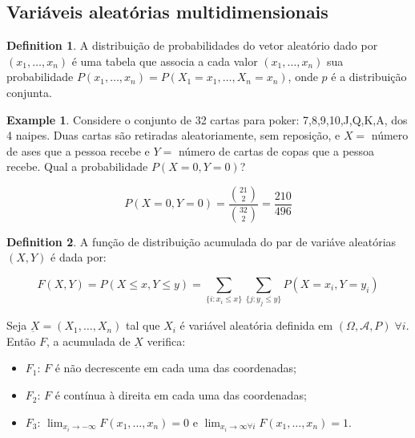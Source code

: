 \documentclass[
]{article}
\providecommand{\tightlist}{%
  \setlength{\itemsep}{0pt}\setlength{\parskip}{0pt}}
\theoremstyle{definition}
\newtheorem{definition}{Definition}[section]
\theoremstyle{definition}
\newtheorem{example}{Example}[section]
\theoremstyle{definition}
\theoremstyle{definition}
\theoremstyle{remark}
\begin{document}
\hypertarget{variuxe1veis-aleatuxf3rias-multidimensionais}{%
\subsection{Variáveis aleatórias multidimensionais}\label{variuxe1veis-aleatuxf3rias-multidimensionais}}

\begin{definition}
A distribuição de probabilidades do vetor aleatório dado por \((x_{1},\ldots,x_{n})\) é uma tabela que associa a cada valor \((x_{1},\ldots,x_{n})\) sua probabilidade \(P(x_{1},\ldots,x_{n}) = P(X_{1} = x_{1}, \ldots,X_{n}=x_{n})\), onde \(p\) é a distribuição conjunta.
\end{definition}

\begin{example}
Considere o conjunto de 32 cartas para poker: 7,8,9,10,J,Q,K,A, dos 4 naipes. Duas cartas são retiradas aleatoriamente, sem reposição, e \(X =\) número de ases que a pessoa recebe e \(Y =\) número de cartas de copas que a pessoa recebe. Qual a probabilidade \(P(X=0,Y=0)\)?

\begin{equation*}
P(X=0,Y=0) = \frac{\binom{21}{2}}{\binom{32}{2}} = \frac{210}{496}
\end{equation*}
\end{example}

\begin{definition}
A função de distribuição acumulada do par de variáve aleatórias \((X,Y)\) é dada por:

\begin{equation*}
F(X,Y) = P(X \le x, Y \le y) = \sum_{\{i:x_{i} \le x\}}\sum_{\{j: y_{j} \le y\}}P(X = x_{i}, Y = y_{i})
\end{equation*}
\end{definition}

Seja \(\underbar{X} = (X_{1}, \ldots, X_{n})\) tal que \(X_{i}\) é variável aleatória definida em \((\Omega, \mathcal{A}, P) \; \forall i\). Então \(F\), a acumulada de \(\underbar{X}\) verifica:

\begin{itemize}
\tightlist
\item
  \textbf{\(F_{1}\)}: \(F\) é não decrescente em cada uma das coordenadas;
\item
  \textbf{\(F_{2}\)}: \(F\) é contínua à direita em cada uma das coordenadas;
\item
  \textbf{\(F_{3}\)}: \(\lim_{x_{i} \to -\infty}F(x_{1}, \ldots, x_{n}) = 0\) e \(\lim_{x_{i} \to \infty \forall i}F(x_{1}, \ldots, x_{n}) = 1\).
\end{itemize}
\end{document}
